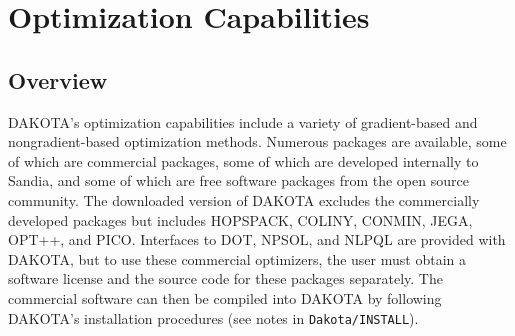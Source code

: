\chapter{Optimization Capabilities}\label{opt}

\section{Overview}\label{opt:overview}

DAKOTA's optimization capabilities include a variety of gradient-based
and nongradient-based optimization methods. Numerous packages are
available, some of which are commercial packages, some of which are
developed internally to Sandia, and some of which are free software
packages from the open source community. The downloaded version of
DAKOTA excludes the commercially developed packages but includes
HOPSPACK, COLINY, CONMIN, JEGA, OPT++, and PICO. Interfaces to DOT,
NPSOL, and NLPQL are provided with DAKOTA, but to use these commercial
optimizers, the user must obtain a software license and the source
code for these packages separately. The commercial software can then
be compiled into DAKOTA by following DAKOTA's installation procedures
(see notes in \texttt{Dakota/INSTALL}).

